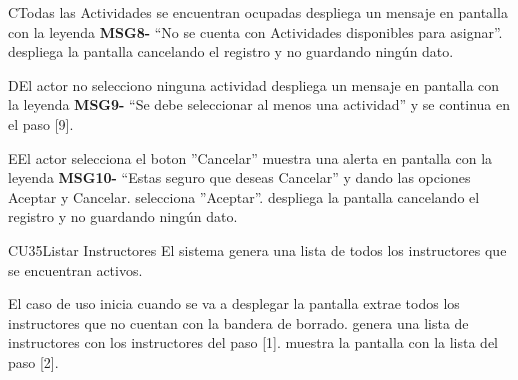 \begin{UCtrayectoriaA}{C}{Todas las Actividades se encuentran ocupadas}
		   \UCpaso despliega un mensaje en pantalla con la leyenda {\bf MSG8-} “No se cuenta con Actividades disponibles para asignar”.
		   \UCpaso despliega la pantalla  cancelando el registro y no guardando ningún dato.
\end{UCtrayectoriaA}
\begin{UCtrayectoriaA}{D}{El actor no selecciono ninguna actividad}
		   \UCpaso despliega un mensaje en pantalla con la leyenda {\bf MSG9-} “Se debe seleccionar al menos una actividad” y se continua en el paso [9].	  
\end{UCtrayectoriaA}
\begin{UCtrayectoriaA}{E}{El actor selecciona el boton ''Cancelar''}
		   \UCpaso muestra una alerta en pantalla con la leyenda {\bf MSG10-} “Estas seguro que deseas Cancelar” y dando las opciones Aceptar y Cancelar.
		   \UCpaso[\UCactor] selecciona ''Aceptar''.
		   \UCpaso despliega la pantalla cancelando el registro y no guardando ningún dato.
\end{UCtrayectoriaA}



\begin{UseCase}{CU35}{Listar Instructores}{
		El sistema genera una lista de todos los instructores que se encuentran activos.
	}
\end{UseCase}
\begin{UCtrayectoria}{El caso de uso inicia cuando se va a desplegar la pantalla }
	\UCpaso extrae todos los instructores que no cuentan con la bandera de borrado.
	\UCpaso genera una lista de instructores con los instructores del paso [1].
	\UCpaso muestra la pantalla   con la lista del paso [2].
\end{UCtrayectoria}

